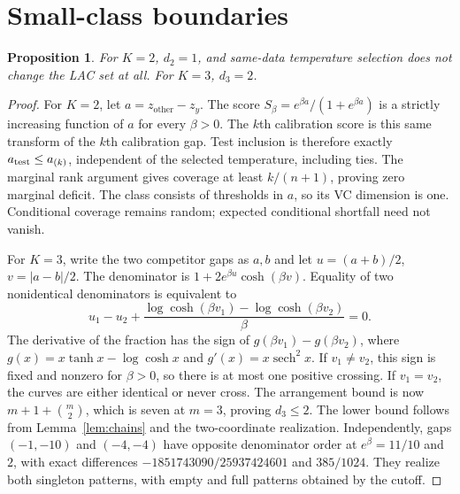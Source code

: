\documentclass[10pt]{article}
\newtheorem{proposition}[theorem]{Proposition}
\theoremstyle{definition}\newtheorem{definition}[theorem]{Definition}
\theoremstyle{remark}\newtheorem{remark}[theorem]{Remark}
\newcommand{\1}{\mathbf 1}
\begin{document}
\section{Small-class boundaries}\label{app:small}
\begin{proposition}\label{prop:small}
For $K=2$, $d_2=1$, and same-data temperature selection does not change the LAC set at all. For $K=3$, $d_3=2$.
\end{proposition}
\begin{proof}
For $K=2$, let $a=z_{\mathrm{other}}-z_y$. The score $S_\beta=e^{\beta a}/(1+e^{\beta a})$ is a strictly increasing function of $a$ for every $\beta>0$. The $k$th calibration score is this same transform of the $k$th calibration gap. Test inclusion is therefore exactly $a_{\rm test}\le a_{(k)}$, independent of the selected temperature, including ties. The marginal rank argument gives coverage at least $k/(n+1)$, proving zero marginal deficit. The class consists of thresholds in $a$, so its VC dimension is one. Conditional coverage remains random; expected conditional shortfall need not vanish.

For $K=3$, write the two competitor gaps as $a,b$ and let $u=(a+b)/2$, $v=|a-b|/2$. The denominator is $1+2e^{\beta u}\cosh(\beta v)$. Equality of two nonidentical denominators is equivalent to
\[
 u_1-u_2+\frac{\log\cosh(\beta v_1)-\log\cosh(\beta v_2)}\beta=0.
\]
The derivative of the fraction has the sign of $g(\beta v_1)-g(\beta v_2)$, where
$g(x)=x\tanh x-\log\cosh x$ and $g'(x)=x\operatorname{sech}^2x$. If $v_1\ne v_2$, this sign is fixed and nonzero for $\beta>0$, so there is at most one positive crossing. If $v_1=v_2$, the curves are either identical or never cross. The arrangement bound is now $m+1+\binom m2$, which is seven at $m=3$, proving $d_3\le2$. The lower bound follows from Lemma~\ref{lem:chains} and the two-coordinate realization. Independently, gaps $(-1,-10)$ and $(-4,-4)$ have opposite denominator order at $e^\beta=11/10$ and $2$, with exact differences $-1851743090/25937424601$ and $385/1024$. They realize both singleton patterns, with empty and full patterns obtained by the cutoff.
\end{proof}
\end{document}
